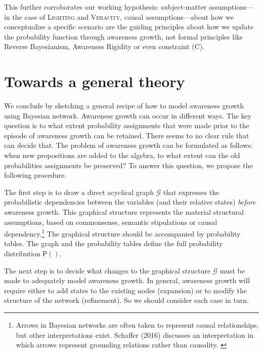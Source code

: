\documentclass[
  11pt,
  dvipsnames,enabledeprecatedfontcommands]{scrartcl}
\newcommand{\pr}[1]{\ensuremath{\mathsf{P}(#1)}}
\begin{document}
This further corroborates our working hypothesis: subject-matter
assumptions---in the case of \textsc{Lighting} and \textsc{Veracity},
causal assumptions---about how we conceptualize a specific scenario are
the guiding principles about how we update the probability function
through awareness growth, not formal principles like Reverse
Bayesianism, Awareness Rigidity or even constraint (C).

\hypertarget{towards-a-general-theory}{%
\section{Towards a general theory}\label{towards-a-general-theory}}

\label{sec:general}

We conclude by sketching a general recipe of how to model awareness
growth using Bayesian network. Awareness growth can occur in different
ways. The key question is to what extent probability assignments that
were made prior to the episode of awareness growth can be retained.
There seems to no clear rule that can decide that. The problem of
awareness growth can be formulated as follows: when new propositions are
added to the algebra, to what extent can the old probabilities
assignments be preserved? To answer this question, we propose the
following procedure.

The first step is to draw a direct acyclical graph \(\mathcal{G}\) that
expresses the probabilistic dependencies between the variables (and
their relative states) \textit{before} awareness growth. This graphical
structure represents the material structural assumptions, based on
commonsense, semantic stipulations or causal dependency.\footnote{Arrows
  in Bayesian networks are often taken to represent causal
  relationships, but other interpretations exist. Schaffer (2016)
  discusses an interpretation in which arrows represent grounding
  relations rather than causality. \label{footnote:causation}} The
graphical structure should be accompanied by probability tables. The
graph and the probability tables define the full probability
distribution \(\pr{}\).

The next step is to decide what changes to the graphical structure
\(\mathcal{G}\) must be made to adequately model awareness growth. In
general, awareness growth will require either to add states to the
existing nodes (expansion) or to modify the structure of the network
(refinement). So we should consider each case in turn.
\end{document}
